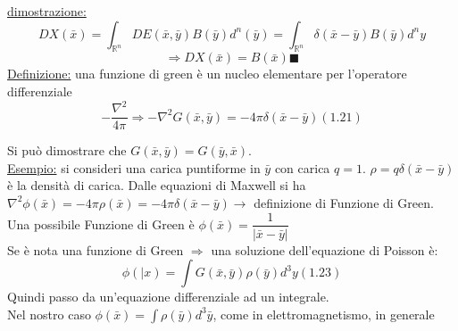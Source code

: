\documentclass[a4paper,11pt]{report}
\newcommand{\Rn}{\mathbb{R}^n}
\newcommand{\x}{\bar{x}}
\newcommand{\y}{\bar{y}}
\begin{document}
\underline{dimostrazione:}\\
$$
DX(\x)=\int_{\Rn}DE(\x,\y)B(\y)d^n(\y)=\int_{\Rn}\delta(\x-\y)B(\y)d^ny
$$
$$
\Rightarrow DX(\x)=B(\x) \blacksquare
$$
\underline{Definizione:} una funzione di green è un nucleo elementare per l'operatore differenziale
\begin{equation}
-\dfrac{\nabla^2}{4\pi}\Rightarrow-\nabla^2G(\x,\y)=-4\pi\delta(\x-\y) (1.21)
\end{equation}

Si può dimostrare che $G(\x,\y)=G(\y,\x)$.\\
\underline{Esempio:} si consideri una carica puntiforme in $\y$ con carica $q=1$. $\rho=q\delta(\x-\y)$ è la densità di carica. Dalle equazioni di Maxwell si ha $\nabla^2\phi(\x)=-4\pi\rho(\x)=-4\pi\delta(\x-\y)\rightarrow$ definizione di Funzione di Green.\\
Una possibile Funzione di Green è $\phi(\x)=\dfrac{1}{|\x-\y|}$\\
Se è nota una funzione di Green $\Rightarrow$ una soluzione dell'equazione di Poisson è:
$$
\phi(|x)=\int G(\x,\y)\rho(\y)d^3y (1.23)
$$
Quindi passo da un'equazione differenziale ad un integrale.\\
Nel nostro caso $\phi(\x)=\int \rho(\y)d^3\y$, come in elettromagnetismo, in generale
\end{document}
